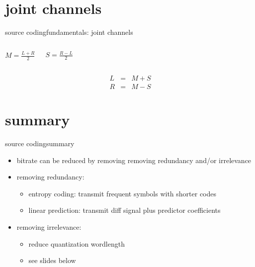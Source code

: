 \section{joint channels}
	\begin{frame}{source coding}{fundamentals: joint channels}
        \vspace{-3mm}
        \begin{columns}
                
                
                \vspace{19mm}
                
                $M = \frac{L+R}{2}$
                
                \vspace{4mm}
                
                $S = \frac{R-L}{2}$
			\end{columns}
			\vspace{-5mm}
            \begin{eqnarray*}
                L &=& M + S\\
                R &=& M - S 
            \end{eqnarray*}
	\end{frame}

	
	
\section{summary}
		\begin{frame}{source coding}{summary}
            \begin{itemize}
                \item   bitrate can be reduced by removing removing redundancy and/or irrelevance
                \smallskip
                \item   removing redundancy:
                    \begin{itemize}
                        \item   entropy coding: transmit frequent symbols with shorter codes
                        \item   linear prediction: transmit diff signal plus predictor coefficients
                    \end{itemize}
                \smallskip
                \item   removing irrelevance:
                    \begin{itemize}
                        \item   reduce quantization wordlength
                        \item   see slides below
                    \end{itemize}
            \end{itemize}
 		\end{frame}



